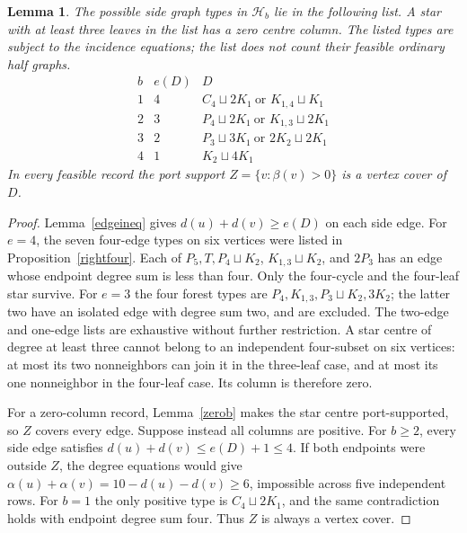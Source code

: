 \documentclass[11pt]{article}
\newtheorem{lemma}[theorem]{Lemma}
\newcommand{\sq}{\sqcup}
\begin{document}
\begin{lemma}\label{dbtypes}
The possible side graph types in $\mathcal H_b$ lie in the following
list. A star with at least three leaves in the list has a zero centre
column. The listed types are subject to the incidence equations; the
list does not count their feasible ordinary half graphs.
\[
\begin{array}{c|c|l}
 b&e(D)&D\\\hline
1&4&C_4\sq2K_1\ \text{or }K_{1,4}\sq K_1\\
2&3&P_4\sq2K_1\ \text{or }K_{1,3}\sq2K_1\\
3&2&P_3\sq3K_1\ \text{or }2K_2\sq2K_1\\
4&1&K_2\sq4K_1
\end{array}
\]
In every feasible record the port support
$Z=\{v:\beta(v)>0\}$ is a vertex cover of $D$.
\end{lemma}
\begin{proof}
Lemma~\ref{edgeineq} gives $d(u)+d(v)\geq e(D)$ on each side edge.
For $e=4$, the seven four-edge types on six vertices were listed in
Proposition~\ref{rightfour}. Each of $P_5,T,P_4\sq K_2$,
$K_{1,3}\sq K_2$, and $2P_3$ has an edge whose endpoint degree sum
is less than four. Only the four-cycle and the four-leaf star survive.
For $e=3$ the four forest types are $P_4,K_{1,3},P_3\sq K_2,3K_2$;
the latter two have an isolated edge with degree sum two, and are
excluded. The two-edge and one-edge lists are exhaustive without
further restriction. A star centre of degree at least three cannot
belong to an independent four-subset on six vertices: at most its two
nonneighbors can join it in the three-leaf case, and at most its one
nonneighbor in the four-leaf case. Its column is therefore zero.

For a zero-column record, Lemma~\ref{zerob} makes the star centre
port-supported, so $Z$ covers every edge. Suppose instead all columns
are positive. For $b\geq2$, every side edge satisfies
$d(u)+d(v)\leq e(D)+1\leq4$. If both endpoints were outside $Z$,
the degree equations would give
$\alpha(u)+\alpha(v)=10-d(u)-d(v)\geq6$, impossible across five
independent rows. For $b=1$ the only positive type is $C_4\sq2K_1$,
and the same contradiction holds with endpoint degree sum four.
Thus $Z$ is always a vertex cover.
\end{proof}
\end{document}
